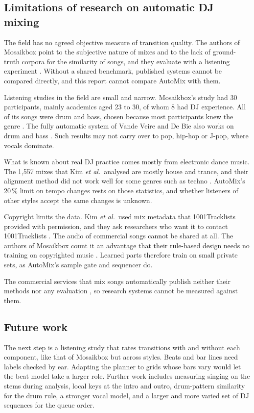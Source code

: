 \documentclass[conference,a4paper]{IEEEtran}
\newcommand{\q}[1]{\textquotedbl{}#1\textquotedbl{}}
\begin{document}
\subsection{Limitations of research on automatic DJ mixing}
The field has no agreed objective measure of transition quality. The authors of Mosaikbox point to
\q{the subjective nature of mixes} and to the lack of ground-truth corpora for the similarity of
songs, and they evaluate with a listening experiment \cite{mosaikbox}. Without a shared benchmark,
published systems cannot be compared directly, and this report cannot compare AutoMix with them.

Listening studies in the field are small and narrow. Mosaikbox's study had 30 participants, mainly
academics aged 23 to 30, of whom 8 had DJ experience. All of its songs were drum and bass, chosen
because most participants knew the genre \cite{mosaikbox}. The fully automatic system of Vande Veire
and De Bie also works on drum and bass \cite{vandeveire2018}. Such results may not carry over to
pop, hip-hop or J-pop, where vocals dominate.

What is known about real DJ practice comes mostly from electronic dance music. The 1,557 mixes that
Kim \emph{et al.}\ analysed are mostly house and trance, and their alignment method did not work
well for some genres such as techno \cite{kim2020}. AutoMix's 20\,\% limit on tempo changes rests on
those statistics, and whether listeners of other styles accept the same changes is unknown.

Copyright limits the data. Kim \emph{et al.}\ used mix metadata that 1001Tracklists provided with
permission, and they ask researchers who want it to contact 1001Tracklists \cite{kim2020}. The
audio of commercial songs cannot be shared at all. The authors of Mosaikbox count it an advantage
that their rule-based design needs no training on copyrighted music \cite{mosaikbox}. Learned parts
therefore train on small private sets, as AutoMix's sample gate and sequencer do.

The commercial services that mix songs automatically publish neither their methods nor any
evaluation \cite{spotifymix,applemix}, so research systems cannot be measured against them.

\subsection{Future work}
The next step is a listening study that rates transitions with and without each component, like
that of Mosaikbox but across styles. Beats and bar lines need labels checked by ear. Adapting the
planner to grids whose bars vary would let the beat model take a larger role. Further work includes
measuring singing on the stems during analysis, local keys at the intro and outro, drum-pattern
similarity for the drum rule, a stronger vocal model, and a larger and more varied set of DJ
sequences for the queue order.
\end{document}
